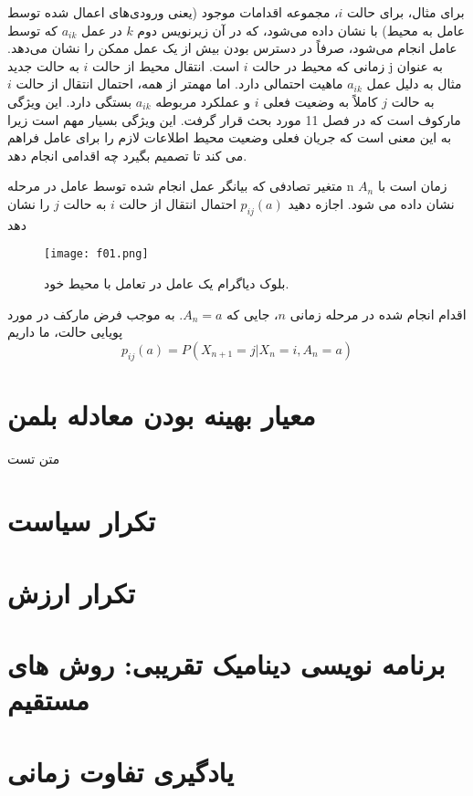 \documentclass[oneside, 11pt, a4paper]{book}
\begin{document}
برای مثال، برای حالت $i$، مجموعه اقدامات موجود (یعنی ورودی‌های اعمال شده توسط عامل به محیط) با نشان داده می‌شود، که در آن زیرنویس دوم $k$ در عمل $a_{ik}$ که توسط عامل انجام می‌شود، صرفاً در دسترس بودن بیش از یک عمل ممکن را نشان می‌دهد. زمانی که محیط در حالت $i$ است. انتقال محیط از حالت $i$ به حالت جدید j به عنوان مثال به دلیل عمل $a_{ik}$ ماهیت احتمالی دارد. اما مهمتر از همه، احتمال انتقال از حالت $i$ به حالت $j$ کاملاً به وضعیت فعلی $i$ و عملکرد مربوطه $a_{ik}$ بستگی دارد. این ویژگی مارکوف است که در فصل 11 مورد بحث قرار گرفت. این ویژگی بسیار مهم است زیرا به این معنی است که جریان فعلی وضعیت محیط اطلاعات لازم را برای عامل فراهم می کند تا تصمیم بگیرد چه اقدامی انجام دهد.


متغیر تصادفی که بیانگر عمل انجام شده توسط عامل در مرحله n زمان است با $A_n$ نشان داده می شود. اجازه دهید $p_{ij}(a)$ احتمال انتقال از حالت $i$ به حالت $j$ را نشان دهد
\begin{figure}[h!]
    \centering
    \texttt{[image: f01.png]}
    \caption{بلوک دیاگرام یک عامل در تعامل با محیط خود.}
\end{figure}

اقدام انجام شده در مرحله زمانی $n$، جایی که $A_n = a$. به موجب فرض مارکف در مورد پویایی حالت، ما داریم
\begin{equation}
    p_{ij}(a) = P(X_{n+1} = j|X_n = i, A_n = a)
\end{equation}






\section{معیار بهینه بودن معادله بلمن}\label{sec:3}

متن تست

\section{تکرار سیاست}\label{sec:4}

\section{تکرار ارزش}\label{sec:5}

\section{برنامه نویسی دینامیک تقریبی: روش های مستقیم}\label{sec:6}

\section{یادگیری تفاوت زمانی}\label{sec:7}
\end{document}
